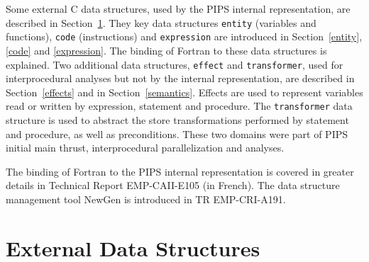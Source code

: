 \iffalse
Ce document est utilise' directement et automatiquement par l'outil
de ge'nie logiciel NewGen pour ge'ne'rer les de'clarations des structures
de donne'es utilise'es dans le projet PIPS, ainsi que les routines de
base qui les manipulent. C'est pourquoi l'ordre des sections n'est pas
ne'cessairement naturel.
\fi

Some external C data structures, used by the PIPS internal
representation, are described in Section~\ref{external}. They key data
structures \verb+entity+ (variables and functions), \verb+code+
(instructions) and \verb+expression+ are introduced in
Section~\ref{entity}, \ref{code} and \ref{expression}. The binding of
Fortran to these data structures is explained. Two additional data
structures, \verb+effect+ and \verb+transformer+, used for
interprocedural analyses but not by the internal representation, are
described in Section~\ref{effects} and in
Section~\ref{semantics}. Effects are used to represent variables read or
written by expression, statement and procedure. The \verb+transformer+
data structure is used to abstract the store transformations performed
by statement and procedure, as well as preconditions. These two domains
were part of PIPS initial main thrust, interprocedural parallelization
and analyses. 

\iffalse
Apre`s une description rapide des structures de donne'es externes a` la
repre'sentation interne de PIPS, nous pre'sentons successivement les
notions d'entite's, de code et d'expressions et la manie`re dont elles
sont utilise'es pour encoder un programme Fortran. Nous de'taillons
ensuite deux structures de donne'es supple'mentaires, les effets et les
{\em transformers} qui sont utilise's pour le calcul de de'pendance
interproce'dural et pour l'analyse syntaxique interproce'durale.
\fi

The binding of Fortran to the PIPS internal representation is covered in
greater details in Technical Report EMP-CAII-E105 (in French). The data
structure management tool NewGen is introduced in TR EMP-CRI-A191.

\iffalse
La manie`re dont les constructions de Fortran sont repre'sente'es est
de'crite dans une des sections du rapport EMP-CAII-E105. NewGen est
pre'sente' dans le rapport EMP-CRI-A191.
\fi

\section{External Data Structures}
\label{external}

